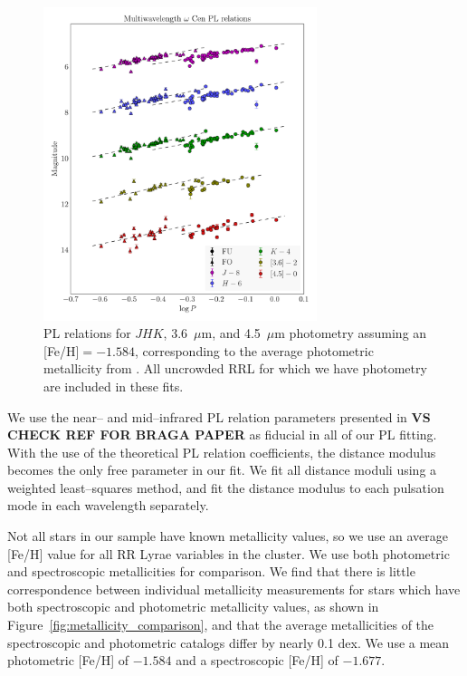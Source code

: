 \documentclass[a4paper,fleqn,usenatbib]{mnras}
\begin{document}
\begin{figure}
\begin{center}
\includegraphics[width=80mm]{final_plots/multiwavelength_PL_allstars_phot.pdf}
\caption{PL relations for $J\!H\!K$, 3.6~$\mu$m, and 4.5~$\mu$m photometry assuming an [Fe/H]$=-1.584$, corresponding to the average photometric metallicity from \citet{2000AJ....119.1824R}. All uncrowded RRL for which we have photometry are included in these fits.}
\label{fig:omegaCen_pl_allstars}
\end{center}
\end{figure}


We use the near-- and mid--infrared PL relation parameters presented in {\bf VS CHECK REF FOR BRAGA PAPER} as fiducial in all of our PL fitting. With the use of the theoretical PL relation coefficients, the distance modulus becomes the only free parameter in our fit. We fit all distance moduli using a weighted least--squares method, and fit the distance modulus to each pulsation mode in each wavelength separately.

Not all stars in our sample have known metallicity values, so we use an average [Fe/H] value for all RR Lyrae variables in the cluster. We use both photometric \citep{2000AJ....119.1824R} and spectroscopic \citep{2006ApJ...640L..43S} metallicities for comparison. We find that there is little correspondence between individual metallicity measurements for stars which have both spectroscopic and photometric metallicity values, as shown in Figure~\ref{fig:metallicity_comparison}, and that the average metallicities of the spectroscopic and photometric catalogs differ by nearly 0.1 dex. We use a mean photometric [Fe/H] of  $-1.584$ and a spectroscopic [Fe/H] of $-1.677$.
\end{document}
